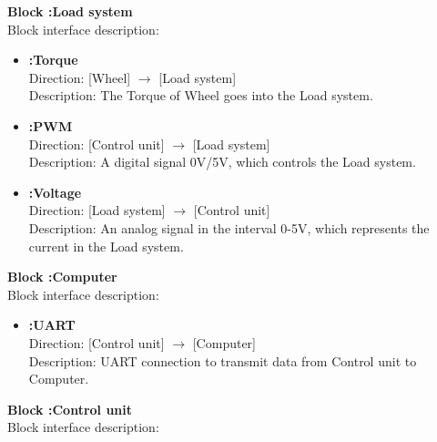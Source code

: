 \textbf{Block :Load system}\\
Block interface description:

\begin{itemize}
	\item \textbf{:Torque}\\
		Direction: [Wheel] $\rightarrow$ [Load system]\\
		Description: The Torque of Wheel goes into the Load system.
	\item \textbf{:PWM}\\
		Direction: [Control unit] $\rightarrow$ [Load system]\\
		Description: A digital signal 0V/5V, which controls the Load system.
	\item \textbf{:Voltage}\\
		Direction: [Load system] $\rightarrow$ [Control unit]\\
		Description: An analog signal in the interval 0-5V, which represents the current in the Load system.
\end{itemize}

\textbf{Block :Computer}\\
Block interface description:

\begin{itemize}
	\item \textbf{:UART}\\
		Direction: [Control unit] $\rightarrow$ [Computer]\\
		Description: UART connection to transmit data from Control unit to Computer.
\end{itemize}

\textbf{Block :Control unit}\\
Block interface description:

